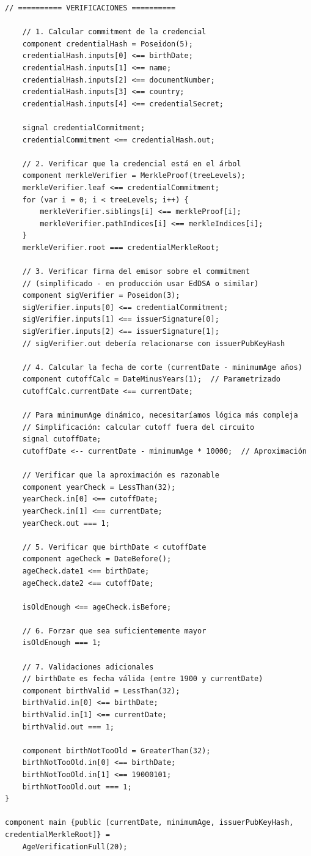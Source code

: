 \documentclass[11pt,a4paper,twoside]{book}
\theoremstyle{definition}
\theoremstyle{remark}
\begin{document}
\begin{lstlisting}[language=circom, caption={Circuito completo de verificación de edad}]
    // ========== VERIFICACIONES ==========
    
    // 1. Calcular commitment de la credencial
    component credentialHash = Poseidon(5);
    credentialHash.inputs[0] <== birthDate;
    credentialHash.inputs[1] <== name;
    credentialHash.inputs[2] <== documentNumber;
    credentialHash.inputs[3] <== country;
    credentialHash.inputs[4] <== credentialSecret;
    
    signal credentialCommitment;
    credentialCommitment <== credentialHash.out;
    
    // 2. Verificar que la credencial está en el árbol
    component merkleVerifier = MerkleProof(treeLevels);
    merkleVerifier.leaf <== credentialCommitment;
    for (var i = 0; i < treeLevels; i++) {
        merkleVerifier.siblings[i] <== merkleProof[i];
        merkleVerifier.pathIndices[i] <== merkleIndices[i];
    }
    merkleVerifier.root === credentialMerkleRoot;
    
    // 3. Verificar firma del emisor sobre el commitment
    // (simplificado - en producción usar EdDSA o similar)
    component sigVerifier = Poseidon(3);
    sigVerifier.inputs[0] <== credentialCommitment;
    sigVerifier.inputs[1] <== issuerSignature[0];
    sigVerifier.inputs[2] <== issuerSignature[1];
    // sigVerifier.out debería relacionarse con issuerPubKeyHash
    
    // 4. Calcular la fecha de corte (currentDate - minimumAge años)
    component cutoffCalc = DateMinusYears(1);  // Parametrizado
    cutoffCalc.currentDate <== currentDate;
    
    // Para minimumAge dinámico, necesitaríamos lógica más compleja
    // Simplificación: calcular cutoff fuera del circuito
    signal cutoffDate;
    cutoffDate <-- currentDate - minimumAge * 10000;  // Aproximación
    
    // Verificar que la aproximación es razonable
    component yearCheck = LessThan(32);
    yearCheck.in[0] <== cutoffDate;
    yearCheck.in[1] <== currentDate;
    yearCheck.out === 1;
    
    // 5. Verificar que birthDate < cutoffDate
    component ageCheck = DateBefore();
    ageCheck.date1 <== birthDate;
    ageCheck.date2 <== cutoffDate;
    
    isOldEnough <== ageCheck.isBefore;
    
    // 6. Forzar que sea suficientemente mayor
    isOldEnough === 1;
    
    // 7. Validaciones adicionales
    // birthDate es fecha válida (entre 1900 y currentDate)
    component birthValid = LessThan(32);
    birthValid.in[0] <== birthDate;
    birthValid.in[1] <== currentDate;
    birthValid.out === 1;
    
    component birthNotTooOld = GreaterThan(32);
    birthNotTooOld.in[0] <== birthDate;
    birthNotTooOld.in[1] <== 19000101;
    birthNotTooOld.out === 1;
}

component main {public [currentDate, minimumAge, issuerPubKeyHash, credentialMerkleRoot]} = 
    AgeVerificationFull(20);
\end{lstlisting}
\end{document}
